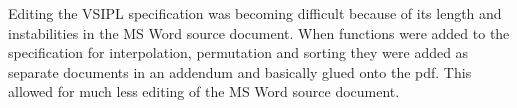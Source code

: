 Editing the VSIPL specification was becoming difficult because of its length and instabilities in the MS Word source document. When functions were added to the specification for interpolation, permutation and sorting they were added as separate documents in an addendum and basically glued onto the pdf. This allowed for much less editing of the MS Word source document.\\
